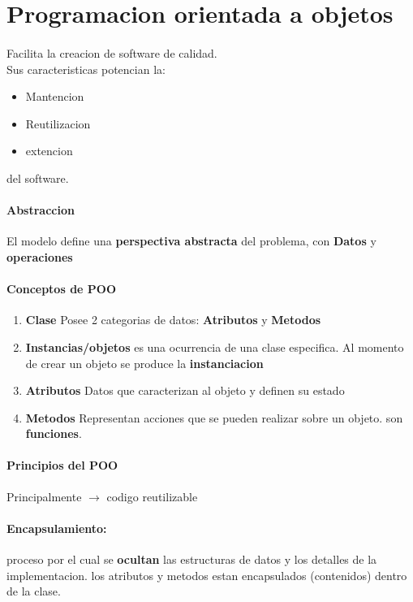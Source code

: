 \documentclass[11pt]{article}
\begin{document}
\section{Programacion orientada a objetos}
\paragraph{}Facilita la creacion de software de calidad.\\
Sus caracteristicas potencian la:\\
\begin{itemize}
	\item Mantencion
	\item Reutilizacion
	\item extencion
\end{itemize}
del software.
\paragraph{Abstraccion} El modelo define una \textbf{perspectiva abstracta} del problema, con \textbf{Datos} y \textbf{operaciones}
\paragraph{Conceptos de POO}
\begin{enumerate}
	\item \textbf{Clase} Posee 2 categorias de datos: \textbf{Atributos} y \textbf{Metodos}
	\item \textbf{Instancias/objetos} es una ocurrencia de una clase especifica. Al momento de crear un objeto se produce la \textbf{instanciacion}
	\item \textbf{Atributos} Datos que caracterizan al objeto y definen su estado
	\item \textbf{Metodos} Representan acciones que se pueden realizar sobre un objeto. son \textbf{funciones}.
\end{enumerate}
\paragraph{Principios del POO}
Principalmente $\rightarrow$ codigo reutilizable 
\paragraph{Encapsulamiento:}proceso por el cual se \textbf{ocultan} las estructuras de datos y los detalles de la implementacion. los atributos y metodos estan encapsulados (contenidos) dentro de la clase.
\end{document}
